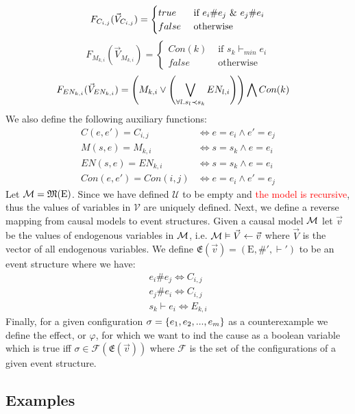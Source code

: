 $$
    F_{C_{i,j}}(\vec V_{C_{i,j}}) = \begin{cases}
        true  & \text{ if } e_i \# e_j \ \& \  e_j \# e_i \\
        false & \text{ otherwise }
    \end{cases}
$$
$$
    F_{M_{k,i}}(\vec V_{M_{k,i}}) = \begin{cases}
        Con(k) & \text{ if } s_k \vdash_{min} e_i \\
        false  & \text{ otherwise }
    \end{cases}
$$
\begin{align*}
    F_{EN_{k,i}}(\vec V_{EN_{k,i}}) & =
    \left(
    M_{k,i} \vee
    \left(
    \bigvee_{\forall l. s_l  \prec s_k}EN_{l,i}
    \right)
    \right)
    \bigwedge
    Con(k)
\end{align*}
We also define the following auxiliary functions:
\begin{align*}
    C(e,e') = C_{i,j}    & \iff e = e_i \wedge e' = e_j \\
    M(s,e)  = M_{k,i}    & \iff s = s_k \wedge e = e_i  \\
    EN(s,e)  = EN_{k,i}    & \iff s = s_k \wedge e = e_i  \\
    Con(e,e') = Con(i,j) & \iff e = e_i \wedge e' = e_j
\end{align*}
Let $\mathcal{M} = \mathfrak{M}(\mathrm{E})$.
Since we have defined $\mathcal{U}$ to be empty and 
\textcolor{red}{the model is recursive}, thus the values of variables in
$\mathcal{V}$ are uniquely defined.
Next, we define a reverse mapping from causal models to event structures.
Given a causal model $\mathcal{M}$ let $\vec v$ be the values of endogenous variables
in $\mathcal{M}$, i.e. $\mathcal{M} \vDash \vec V \leftarrow \vec v$ where $\vec V$ is the vector of
all endogenous variables.
We define $\mathfrak{E}(\vec v) = (\mathrm{E},\#',\vdash')$ to be an 
event structure where we have:
\begin{align*}
    e_i \# e_j \iff C_{i,j} \\
    e_j \# e_i \iff C_{i,j} \\
    s_k \vdash e_i \iff E_{k,i}
\end{align*}
Finally, for a given configuration $\sigma = \{e_1,e_2,...,e_m\}$ as a
counterexample we define the effect, or $\varphi$, for which we want to
ind the cause as a boolean variable which is true iff $\sigma \in \mathcal{F}(\mathfrak{E}(\vec v))$ where $\mathcal{F}$ is the set of the configurations of
a given event structure.
\pagebreak
\subsection{Examples}
